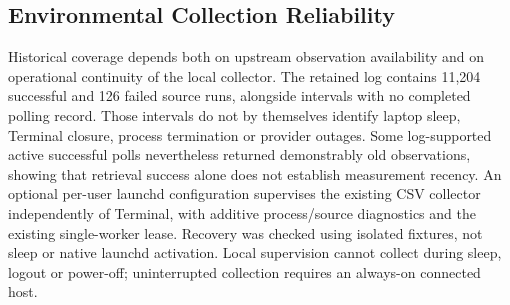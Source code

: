 \subsection{Environmental Collection Reliability}
Historical coverage depends both on upstream observation availability and on
operational continuity of the local collector. The retained log contains 11,204
successful and 126 failed source runs, alongside intervals with no completed
polling record. Those intervals do not by themselves identify laptop sleep,
Terminal closure, process termination or provider outages. Some log-supported
active successful polls nevertheless returned demonstrably old observations,
showing that retrieval success alone does not establish measurement recency.
An optional per-user launchd configuration supervises the existing CSV collector
independently of Terminal, with additive process/source diagnostics and the existing
single-worker lease. Recovery was checked using isolated fixtures, not sleep or
native launchd activation. Local supervision cannot collect during sleep, logout
or power-off; uninterrupted collection requires an always-on connected host.
